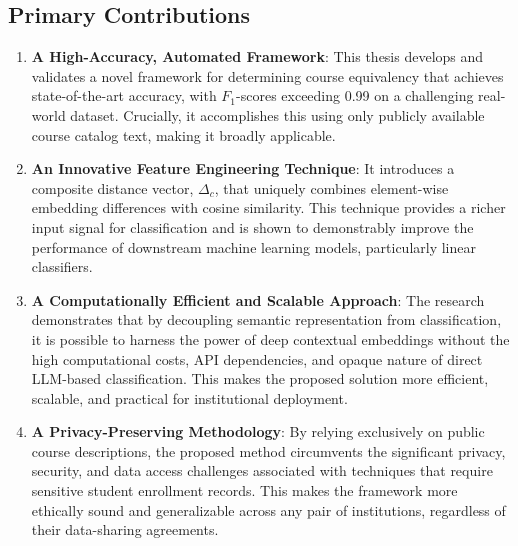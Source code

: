 \subsection{Primary Contributions}
\begin{enumerate}
\item \textbf{A High-Accuracy, Automated Framework}: This thesis develops and validates a novel framework for determining course equivalency that achieves state-of-the-art accuracy, with \(F_1\)-scores exceeding 0.99 on a challenging real-world dataset. Crucially, it accomplishes this using only publicly available course catalog text, making it broadly applicable.
\item \textbf{An Innovative Feature Engineering Technique}: It introduces a composite distance vector, \(\Delta_c\), that uniquely combines element-wise embedding differences with cosine similarity. This technique provides a richer input signal for classification and is shown to demonstrably improve the performance of downstream machine learning models, particularly linear classifiers.
\item \textbf{A Computationally Efficient and Scalable Approach}: The research demonstrates that by decoupling semantic representation from classification, it is possible to harness the power of deep contextual embeddings without the high computational costs, API dependencies, and opaque nature of direct LLM-based classification. This makes the proposed solution more efficient, scalable, and practical for institutional deployment.
\item \textbf{A Privacy-Preserving Methodology}: By relying exclusively on public course descriptions, the proposed method circumvents the significant privacy, security, and data access challenges associated with techniques that require sensitive student enrollment records. This makes the framework more ethically sound and generalizable across any pair of institutions, regardless of their data-sharing agreements.
\end{enumerate}

